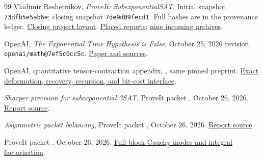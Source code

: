 \begin{thebibliography}{99}
\footnotesize
\setlength{\itemsep}{2pt}
 Vladimir Reshetnikov, \emph{ProveIt: SubexponentialSAT}.
Initial snapshot \texttt{73dfb5e5ab6e};
closing snapshot \texttt{7de9d09fecd1}. Full hashes are in the provenance ledger.
\href{https://github.com/VladimirReshetnikov/ProveIt/tree/7de9d09fecd17de776d712835ecb2011205c531d/Computability/SubexponentialSAT}{Closing project layout}.
\href{https://github.com/VladimirReshetnikov/ProveIt/tree/73dfb5e5ab6e91bd7375e5b97ef85d7e1cc8e81d/Computability/SubexponentialSAT}{Placed reports};
\href{https://github.com/VladimirReshetnikov/ProveIt/tree/73dfb5e5ab6e91bd7375e5b97ef85d7e1cc8e81d/docs/incoming}{nine incoming archives}.

 OpenAI, \emph{The Exponential Time Hypothesis is False},
October 25, 2026 revision. \texttt{openai/math@7ef5c0cc5c}.
\href{https://github.com/openai/math/tree/7ef5c0cc5ca4b0e072b7a050fca09ab24bc6fa3a/preprints/The-Exponential-Time-Hypothesis-is-False-October-25-2026}{Paper and sources}.

 OpenAI, quantitative tensor-contraction appendix,
, same pinned preprint.
\href{https://github.com/openai/math/blob/7ef5c0cc5ca4b0e072b7a050fca09ab24bc6fa3a/preprints/The-Exponential-Time-Hypothesis-is-False-October-25-2026/build/quantitative-contraction.tex}{Exact deformation, recovery, recursion, and bit-cost interface}.

 \emph{Sharper precision for subexponential 3SAT},
ProveIt packet , October 26, 2026.
\href{https://github.com/VladimirReshetnikov/ProveIt/blob/73dfb5e5ab6e91bd7375e5b97ef85d7e1cc8e81d/Computability/SubexponentialSAT/Research/3sat_precision_refinement/report.tex}{Report source}.

 \emph{Asymmetric packet balancing},
ProveIt packet , October 26, 2026.
\href{https://github.com/VladimirReshetnikov/ProveIt/blob/73dfb5e5ab6e91bd7375e5b97ef85d7e1cc8e81d/Computability/SubexponentialSAT/Research/eth_asymmetric_packet_balancing/report.tex}{Report source}.

 ProveIt packet , October 26, 2026.
\href{https://github.com/VladimirReshetnikov/ProveIt/blob/73dfb5e5ab6e91bd7375e5b97ef85d7e1cc8e81d/Computability/SubexponentialSAT/Research/eth_joint_cauchy/report.tex}{Full-block Cauchy modes and integral factorization}.


\end{thebibliography}

